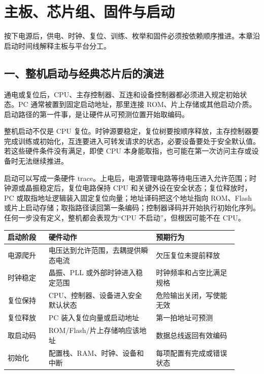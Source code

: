 \chapter{主板、芯片组、固件与启动}

\begin{keyidea}
按下电源后，供电、时钟、复位、训练、枚举和固件必须按依赖顺序推进。本章沿启动时间线解释主板与平台分工。
\end{keyidea}

\section{一、整机启动与经典芯片后的演进}

通电或复位后，CPU、主存控制器、互连和设备控制器都必须进入规定初始状态。PC 通常被置到固定启动地址，那里连接 ROM、片上存储或其他启动介质。启动路径的第一件事，是让硬件从可预测位置开始取编码。

整机启动不仅是 CPU 复位。时钟源要稳定，复位树要按顺序释放，主存控制器要完成训练或初始化，互连要进入可转发请求的状态，必要设备要处于安全默认值。若这些硬件条件没有满足，即使 CPU 本身能取指，也可能在第一次访问主存或设备时无法继续推进。

启动可以写成一条硬件 trace。上电后，电源管理电路等待电压进入允许范围；时钟源或晶振稳定后，复位电路保持 CPU 和关键外设在安全状态；复位释放时，PC 或取指地址逻辑装入固定复位向量；地址译码把这个地址指向 ROM、Flash 或片上启动存储；取指路径读回第一条编码；控制器译码并开始执行初始化序列。任何一步没有定义，整机都会表现为“CPU 不启动”，但根因可能不在 CPU。

\begin{longtable}{L{0.16\linewidth}L{0.42\linewidth}L{0.32\linewidth}}
\toprule
启动阶段 & 硬件动作 & 预期行为 \\
\midrule
电源爬升 & 电压达到允许范围，去耦提供瞬态电流 & 欠压复位未提前释放 \\\tablerowrule
时钟稳定 & 晶振、PLL 或外部时钟进入稳定范围 & 时钟频率和占空比满足规格 \\\tablerowrule
复位保持 & CPU、控制器、设备进入安全默认状态 & 危险输出关闭，写使能无效 \\\tablerowrule
复位释放 & PC 装入复位向量或启动地址 & 第一拍地址可预测 \\\tablerowrule
取启动码 & ROM/Flash/片上存储响应该地址 & 数据总线返回有效编码 \\\tablerowrule
初始化 & 配置栈、RAM、时钟、设备和中断 & 每项配置有完成或错误状态 \\
\bottomrule
\end{longtable}

